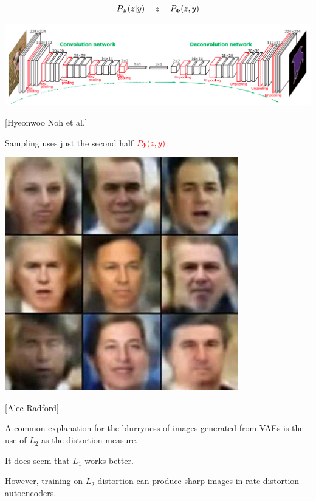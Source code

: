 {

$$P_\Psi(z|y) \hspace{3ex} z \hspace{3ex} P_\Phi(z,y)$$

\centerline{\includegraphics[width=6in]{../images/Deconv}}
\centerline{\large [Hyeonwoo Noh et al.]}

\vfill
Sampling uses just the second half ${\color{red} P_\Phi(z,y)}$.


\vfill
\centerline{\includegraphics[width = 4in]{../images/VariationalFaces}}
\centerline{[Alec Radford]}


A common explanation for the blurryness of images generated from VAEs
is the use of $L_2$ as the distortion measure.

\vfill
It does seem that $L_1$ works better.

\vfill
However, training on $L_2$ distortion can produce sharp images in
rate-distortion autoencoders.


}
